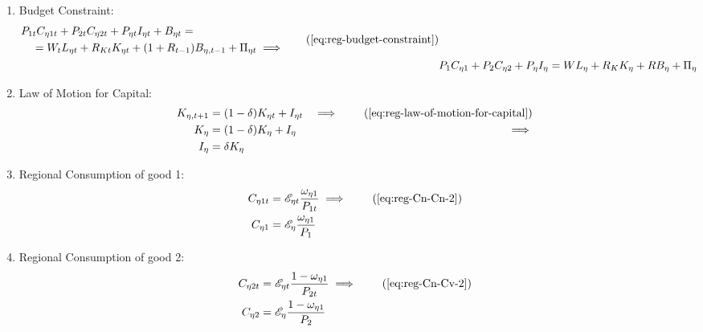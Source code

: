 \documentclass[
thesis.tex
]{subfiles}
\begin{document}
\begin{enumerate}

	\item Budget Constraint: 
	\begin{align}
	\begin{split}
		& P_{1 t} C_{\eta 1 t} + P_{2 t} C_{\eta 2 t} + P_{\eta t} I_{\eta t} + B_{\eta t} = \\ & \quad = W_t L_{\eta t} + R_{Kt} K_{\eta t} + (1 + R_{t-1}) B_{\eta,t-1} + \Pi_{\eta t} \implies
	\end{split} \tag{\ref{eq:reg-budget-constraint}}
	\\
	& P_{1} C_{\eta 1} + P_{2} C_{\eta 2} + P_{\eta} I_{\eta} = W L_{\eta} + R_{K} K_{\eta} + R B_{\eta} + \Pi_{\eta} \label{eq:reg-ss-budget-constraint}
	\end{align}

	\item Law of Motion for Capital:
	\begin{alignat}{2}
		K_{\eta, t+1} &= (1-\delta)K_{\eta t} + I_{\eta t} &\implies \tag{\ref{eq:reg-law-of-motion-for-capital}} \\
		K_{\eta} &= (1-\delta)K_{\eta} + I_{\eta} &\implies \nonumber \\
		I_{\eta} &= \delta K_{\eta} \label{eq:reg-ss-law-of-motion-for-capital}
	\end{alignat}

	\item Regional Consumption of good 1:
	\begin{align}
		C_{\eta 1 t} &= \te \frac{\omega_{\eta 1}}{P_{1 t}} \implies \tag{\ref{eq:reg-Cn-Cn-2}} \\
		C_{\eta 1} &= \te[] \frac{\omega_{\eta 1}}{P_{1}} \label{eq:reg-ss-C1-Cn-2}
	\end{align}

	\item Regional Consumption of good 2:
	\begin{align}
		C_{\eta 2 t} &= \te \frac{1 -\omega_{\eta 1}}{P_{2 t}} \implies \tag{\ref{eq:reg-Cn-Cv-2}} \\
		C_{\eta 2} &= \te[] \frac{1 -\omega_{\eta 1}}{P_{2}} \label{eq:reg-ss-C2-Cn-2}
	\end{align}

\begin{comment}
	\item Regional Consumption:
	\begin{align}
		C_{\eta t} &= C_{\eta 1 t}^{\omega_{\eta 1}} C_{\eta 2 t}^{1-\omega_{\eta 1}} \implies \tag{\ref{eq:reg-consumption-aggregation}} \\
		C_{\eta} &= C_{\eta 1}^{\omega_{\eta 1}} C_{\eta 2}^{1-\omega_{\eta 1}} \label{eq:reg-ss-consumption-aggregation}
	\end{align}
	

\end{comment}
\end{enumerate}
\end{document}
